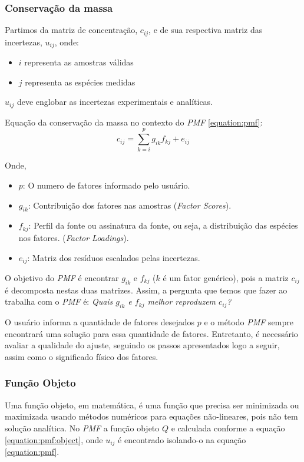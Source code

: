 \subsubsection{Conservação da massa}
Partimos da matriz de concentração, $c_{ij}$, e de sua respectiva matriz das incertezas, $u_{ij}$, onde:
\begin{itemize}
  \item $i$ representa as amostras válidas
  \item $j$ representa as espécies medidas
\end{itemize}
$u_{ij}$ deve englobar as incertezas experimentais e analíticas.

Equação da conservação da massa no contexto do \textit{PMF} \ref{equation:pmf}: 
\begin{equation}
  c_{ij} = \sum_{k=i}^p g_{ik}f_{kj} + e_{ij}
  \label{equation:pmf}
\end{equation}

Onde,
\begin{itemize}
  \item $p$: O numero de fatores informado pelo usuário.
  \item $g_{ik}$: Contribuição dos fatores nas amostras (\textit{Factor Scores}).
  \item $f_{kj}$: Perfil da fonte ou assinatura da fonte, ou seja, a distribuição das espécies nos fatores. (\textit{Factor Loadings}).
  \item $e_{ij}$: Matriz dos resíduos escalados pelas incertezas.
\end{itemize}

O objetivo do \textit{PMF} é encontrar $g_{ik}$ e $f_{kj}$ ($k$ é um fator genérico), pois a matriz $c_{ij}$ é decomposta nestas duas matrizes. Assim, a pergunta que temos que fazer ao trabalha com o \textit{PMF} é: 
\textit{Quais $g_{ik}$ e $f_{kj}$ melhor reproduzem $c_{ij}$?}

O usuário informa a quantidade de fatores desejados $p$ e o método \textit{PMF} sempre encontrará uma solução para essa quantidade de fatores. Entretanto, é necessário avaliar a qualidade do ajuste, seguindo os passos apresentados logo a seguir, assim como o significado físico dos fatores. 

\subsubsection{Função Objeto}
Uma função objeto, em matemática, é uma função que precisa ser minimizada ou maximizada usando métodos numéricos para equações não-lineares, pois não tem solução analítica. No \textit{PMF} a função objeto $Q$ e calculada conforme a equação \ref{equation:pmf:object}, onde ${u_{ij}}$ é encontrado isolando-o na equação \ref{equation:pmf}.

